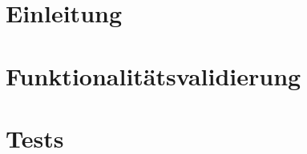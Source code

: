 

	\maketitle
	\setcounter{tocdepth}{1}
	\tableofcontents

	\chapter{Einleitung}
		
	\chapter{Funktionalitätsvalidierung}
	\chapter{Tests}
	\label{chap:test}
		

